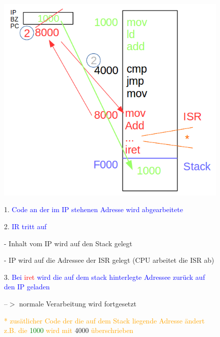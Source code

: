 \documentclass[12pt,a4paper,oneside,ngerman]{article}
\begin{document}
\begin{figure}[H]
	\begin{minipage}[t]{6cm}
	\vspace{0pt}
	\centering
	\includegraphics[scale=0.35]{umlet/Singelcore_scheduling.png}
	\end{minipage}
	\hfill
	\begin{minipage}[t]{6cm}
	\vspace{0pt}
	\begin{description}
	\item 1. \textcolor{blue}{Code an der im IP stehenen Adresse wird abgearbeitete}
	\item 2. \textcolor{blue}{IR tritt auf}
		\begin{description}
			\item - Inhalt vom IP wird auf den Stack gelegt
			\item - IP wird auf die Adressee der ISR gelegt (CPU arbeitet die ISR ab)
		\end{description}
	\item 3. \textcolor{blue}{Bei } \textcolor{red}{iret} \textcolor{blue}{ wird die auf dem stack hinterlegte Adressee zurück auf den IP geladen}
	\item --$>$ normale Verarbeitung wird fortgesetzt
	\end{description}
	\end{minipage}

	\textcolor{orange}{* zusätlicher Code der die auf dem Stack liegende Adresse ändert} \\
	\textcolor{orange}{z.B. die} \textcolor{green}{1000} \textcolor{orange} {wird mit} 4000 \textcolor{orange}{überschrieben} \\
\end{figure}
\end{document}
